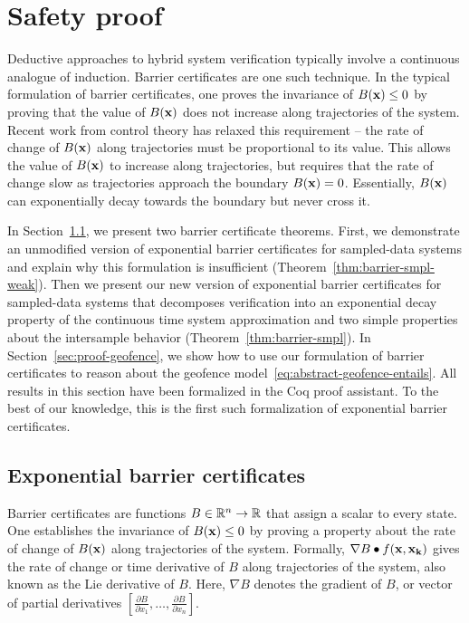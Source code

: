 
\section{Safety proof}
\label{sec:proof}
Deductive approaches to hybrid system verification typically involve a
continuous analogue of induction. Barrier certificates are one such
technique. In the typical formulation of barrier certificates, one proves
the invariance of $B(\mathbf{x}) \leq 0$ by proving that the value of
$B(\mathbf{x})$ does not increase along trajectories of the system. Recent
work from control theory has relaxed this requirement -- the rate of change
of $B(\mathbf{x})$ along trajectories must be proportional to its
value. This allows the value of $B(\mathbf{x})$ to increase along
trajectories, but requires that the rate of change slow as trajectories
approach the boundary $B(\mathbf{x}) = 0$. Essentially, $B(\mathbf{x})$
can exponentially decay towards the boundary but never cross it.

In Section~\ref{sec:proof-barrier}, we present two barrier certificate
theorems. First, we demonstrate an unmodified version of exponential
barrier certificates for sampled-data systems and explain why this
formulation is insufficient (Theorem~\ref{thm:barrier-smpl-weak}). Then we
present our new version of exponential barrier certificates for
sampled-data systems that decomposes verification into an exponential decay
property of the continuous time system approximation and two simple
properties about the intersample behavior
(Theorem~\ref{thm:barrier-smpl}). In Section~\ref{sec:proof-geofence}, we show
how to use our formulation of barrier certificates to reason about the
geofence model~\eqref{eq:abstract-geofence-entails}. All results in this
section have been formalized in the Coq proof assistant. To the best of our
knowledge, this is the first such formalization of exponential barrier
certificates.

\subsection{Exponential barrier certificates}
\label{sec:proof-barrier}
Barrier certificates are functions $B \in \mathbb{R}^n \rightarrow \mathbb{R}$ that assign
a scalar to every state. One establishes the invariance of $B(\mathbf{x})
\leq 0$ by proving a property about the rate of change of $B(\mathbf{x})$
along trajectories of the system. Formally, $\nabla B \bullet
f(\mathbf{x},\mathbf{x_k})$ gives the rate of change or time derivative
of $B$ along trajectories of the system, also known as the Lie derivative
of $B$. Here, $\nabla B$ denotes the gradient of $B$, or vector of partial
derivatives $[\frac{\partial B}{\partial x_1},\ldots,\frac{\partial
    B}{\partial x_n}]$.

